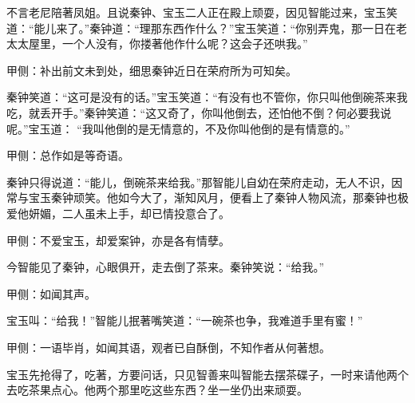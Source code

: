 \begin{parag}
    不言老尼陪著凤姐。且说秦钟、宝玉二人正在殿上顽耍，因见智能过来，宝玉笑道：“能儿来了。”秦钟道：“理那东西作什么？”宝玉笑道：“你别弄鬼，那一日在老太太屋里，一个人没有，你搂著他作什么呢？这会子还哄我。”\begin{note}甲侧：补出前文未到处，细思秦钟近日在荣府所为可知矣。\end{note}秦钟笑道：“这可是没有的话。”宝玉笑道：“有没有也不管你，你只叫他倒碗茶来我吃，就丢开手。”秦钟笑道：“这又奇了，你叫他倒去，还怕他不倒？何必要我说呢。”宝玉道： “我叫他倒的是无情意的，不及你叫他倒的是有情意的。”\begin{note}甲侧：总作如是等奇语。\end{note}秦钟只得说道：“能儿，倒碗茶来给我。”那智能儿自幼在荣府走动，无人不识，因常与宝玉秦钟顽笑。他如今大了，渐知风月，便看上了秦钟人物风流，那秦钟也极爱他妍媚，二人虽未上手，却已情投意合了。\begin{note}甲侧：不爱宝玉，却爱案钟，亦是各有情孽。\end{note}今智能见了秦钟，心眼俱开，走去倒了茶来。秦钟笑说：“给我。”\begin{note}甲侧：如闻其声。\end{note}宝玉叫：“给我！”智能儿抿著嘴笑道：“一碗茶也争，我难道手里有蜜！”\begin{note}甲侧：一语毕肖，如闻其语，观者已自酥倒，不知作者从何著想。\end{note}宝玉先抢得了，吃著，方要问话，只见智善来叫智能去摆茶碟子，一时来请他两个去吃茶果点心。他两个那里吃这些东西？坐一坐仍出来顽耍。
\end{parag}


